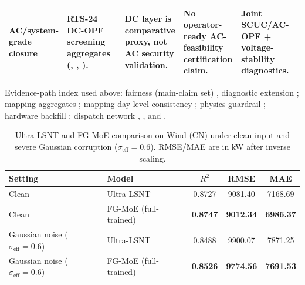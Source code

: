 ﻿\documentclass[review,1p,times]{elsarticle}
\begin{document}
\begin{table}[t]
{\begin{tabular}{L{0.17\linewidth}L{0.21\linewidth}L{0.20\linewidth}L{0.20\linewidth}L{0.20\linewidth}}
AC/system-grade closure & RTS-24 DC-OPF screening aggregates (, , ). & DC layer is comparative proxy, not AC security validation. & No operator-ready AC-feasibility certification claim. & Joint SCUC/AC-OPF + voltage-stability diagnostics. \\
\bottomrule
\end{tabular}%
}
\vspace{3pt}
\footnotesize Evidence-path index used above: fairness (main-claim set) , diagnostic extension ; mapping aggregates ; mapping day-level consistency ; physics guardrail ; hardware backfill ; dispatch network , , and .
\endgroup
\end{table}

\begin{table}[t]
\centering
\caption{Ultra-LSNT and FG-MoE comparison on Wind (CN) under clean input and severe Gaussian corruption ($\sigma_{\mathrm{eff}}=0.6$). RMSE/MAE are in kW after inverse scaling.}
\label{tab:pimoe_windcn_ablation}
\begin{tabular}{llccc}
\toprule
Setting & Model & $R^2$ & RMSE & MAE \\
\midrule
Clean & Ultra-LSNT & 0.8727 & 9081.40 & 7168.69 \\
Clean & FG-MoE (full-trained) & \textbf{0.8747} & \textbf{9012.34} & \textbf{6986.37} \\
Gaussian noise ($\sigma_{\mathrm{eff}}=0.6$) & Ultra-LSNT & 0.8488 & 9900.07 & 7871.25 \\
Gaussian noise ($\sigma_{\mathrm{eff}}=0.6$) & FG-MoE (full-trained) & \textbf{0.8526} & \textbf{9774.56} & \textbf{7691.53} \\
\bottomrule
\end{tabular}
\end{table}
\end{document}
